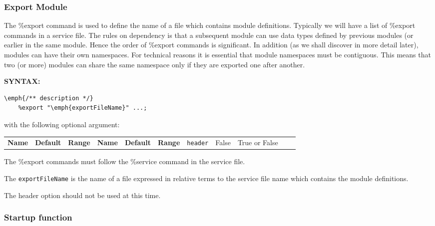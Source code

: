 \subsubsection{Export Module} \label{export}

The \%export command is used to define the name of a file which contains module definitions. Typically we will have a list of \%export commands in a service file. The rules on dependency is that a subsequent module can use data types defined by previous modules (or earlier in the same module. Hence the order of \%export commands is significant. 
In addition (as we shall discover in more detail later), modules can have their own namespaces. For technical reasons it is essential that module namespaces must be contiguous. This means that two (or more) modules can share the same namespace only if they are exported one after another.

\textbf{SYNTAX:}
\nopagebreak
\begin{Verbatim}[commandchars=\\\{\}]
    \emph{/** description */}
    %export "\emph{exportFileName}" ...;
\end{Verbatim}

with the following optional argument:


\small

\begin{longtable}{|p{80pt}|p{150pt}|p{140pt}|l}

 \textbf{Name} & \textbf{Default} & \textbf{Range} & 
\endfirsthead

 \textbf{Name} & \textbf{Default} & \textbf{Range} & 
\endhead

 
\endfoot

\endlastfoot

 \texttt{header} & False & True or False \\ 

\end{longtable}
\normalsize
The \%export commands must follow the \%service command in the service file.

The \texttt{exportFileName} is the name of a file expressed in relative terms to the service file name which contains the module definitions.

The header option should not be used at this time.


\subsubsection{Startup function} \label{startup}

